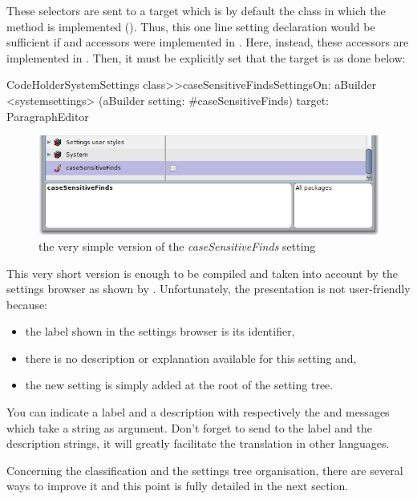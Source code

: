 \documentclass[a4paper,10pt,twoside]{book}
\begin{document}
These selectors are sent to a target which is by default the class in which the method is implemented (\ie {}). Thus, this one line setting declaration would be sufficient if   and  accessors were implemented in . Here, instead, these accessors are implemented in . Then, it must be explicitly set that the target is  as done below:
\begin{code}{}
CodeHolderSystemSettings class>>caseSensitiveFindsSettingsOn: aBuilder
	<systemsettings>
	(aBuilder setting: #caseSensitiveFinds) 
		target: ParagraphEditor
\end{code}
\begin{figure}[tbh]
\begin{center}
\includegraphics[scale=0.4]{caseSensitiveFinds_setting_declaration2}
\caption{the very simple version of the \textit{caseSensitiveFinds} setting}
\end{center}
\end{figure}
This very short version is enough to be compiled and taken into account by the settings browser as shown by .
Unfortunately, the presentation is not user-friendly because:
\begin{itemize}
\item the label shown in the settings browser is its identifier,
\item there is no description or explanation available for this setting and,
\item the new setting is simply added at the root of the setting tree. 
\end{itemize}
You can indicate a label and a description with respectively the  and  messages which take a string as argument. Don't forget to send  to the label and the description strings, it will greatly facilitate the translation in other languages.

Concerning the classification and the settings tree organisation, there are several ways to improve it and this point is fully detailed in the next section.
\end{document}
